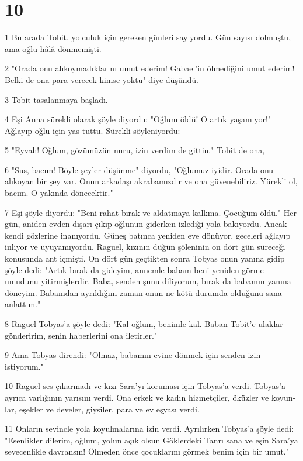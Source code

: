 \chapter{10}

\par 1 Bu arada Tobit, yolculuk için ge­reken günleri sayıyordu. Gün sa­yısı dolmuştu, ama oğlu hâlâ dönme­mişti.
\par 2 "Orada onu alıkoymadıklarını umut ederim! Gabael'in ölmediğini umut ederim! Belki de ona para verecek kimse yoktu" diye düşündü.
\par 3 Tobit ta­salanmaya başladı.
\par 4 Eşi Anna sürekli olarak şöyle diyordu: "Oğlum öldü! O artık yaşamıyor!" Ağlayıp oğlu için yas tuttu. Sürekli söyleniyordu:
\par 5 "Eyvah! Oğlum, gözümüzün nuru, izin verdim de gittin." Tobit de ona,
\par 6 "Sus, ba­cım! Böyle şeyler düşünme" diyordu, "Oğlumuz iyidir. Orada onu alıkoyan bir şey var. Onun arkadaşı akrabamızdır ve ona güvenebiliriz. Yürekli ol, ba­cım. O yakında dönecektir."
\par 7 Eşi şöy­le diyordu: "Beni rahat bırak ve aldat­maya kalkma. Çocuğum öldü." Her gün, aniden evden dışarı çıkıp oğlunun gi­derken izlediği yola bakıyordu. Ancak kendi gözlerine inanıyordu. Güneş batınca yeniden eve dönüyor, geceleri ağlayıp inliyor ve uyuyamıyordu. Raguel, kızının düğün şöleninin on dört gün süreceği konusunda ant içmişti. On dört gün geçtikten sonra Tobyas onun yanına gidip şöyle dedi: "Artık bırak da gideyim, annemle babam beni yeniden görme umudunu yitirmişlerdir. Baba, senden şunu dili­yorum, bırak da babamın yanına döneyim. Babamdan ayrıldığım zaman onun ne kötü durumda olduğunu sana anlattım."
\par 8 Raguel Tobyas'a şöyle dedi: "Kal oğlum, benimle kal. Baban Tobit'e ulaklar gönderirim, senin haberlerini ona iletirler."
\par 9 Ama Tobyas direndi: "Olmaz, babamın evine dönmek için senden izin istiyorum."
\par 10 Raguel ses çıkarmadı ve kızı Sara'yı koruması için Tobyas'a verdi. Tobyas'a ayrıca varlığının yarısını verdi. Ona erkek ve kadın hizmetçiler, öküzler ve koyun­lar, eşekler ve develer, giysiler, para ve ev eşyası verdi.
\par 11 Onların sevincle yola koyulmalarına izin verdi. Ayrılırken Tobyas'a şöyle dedi: "Esenlikler dilerim, oğlum, yolun açık olsun Göklerdeki Tanrı sana ve eşin Sara'ya sevecenlikle davransın! Ölmeden önce çocuklarını görmek benim için bir umut."
